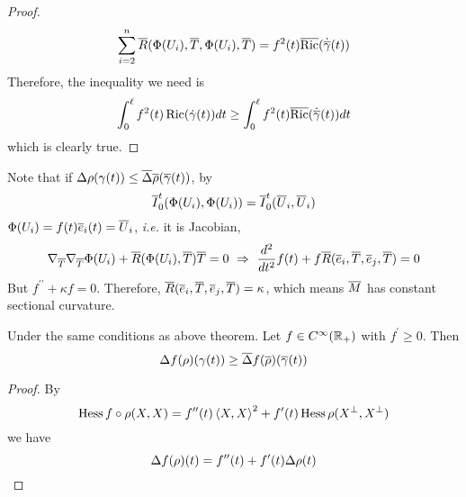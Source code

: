 \begin{enumerate}[label=\arabic{*}]
\begin{proof}
		\begin{equation*}
			\sum_{i=2}^n \overline{R}(\Phi(U_i),{\overline{T}},\Phi(U_i),{\overline{T}}) = f^2(t)\overline{\operatorname{Ric}}(\dot{\overline{\gamma}}(t))
		\end{equation*}
		Therefore, the inequality we need is
		\begin{equation*}
			\int_0^\ell f^2(t)\operatorname{Ric}(\dot{\gamma}(t)) dt \geq \int_0^\ell f^2(t)\overline{\operatorname{Ric}}(\dot{\overline{\gamma}}(t))dt
		\end{equation*}
		which is clearly true.
	\end{proof}
	\begin{rmk}
		Note that if $\Delta \rho (\gamma(t)) \leq \overline{\Delta} \overline{\rho}(\overline{\gamma}(t))$, by
		\begin{equation*}
			\overline{I}_0^t(\Phi(U_i),\Phi(U_i)) = \overline{I}_0^t(\overline{U}_i,\overline{U}_i)
		\end{equation*}
		$\Phi(U_i) = f(t)\overline{e}_i(t) = \overline{U}_i$, \emph{i.e.} it is Jacobian,
		\begin{equation*}
			\nabla_{\overline{T}}\nabla_{\overline{T}}\Phi(U_i)+\overline{R}(\Phi(U_i),\overline{T})\overline{T} = 0 ~\Rightarrow~ \frac{d^2}{dt^2}f(t) + f\overline{R}(\overline{e}_i,\overline{T},\overline{e}_j,\overline{T}) = 0
		\end{equation*}
		But $f^{\prime\prime} + \kappa f = 0$. Therefore, $\overline{R}(\overline{e}_i,\overline{T},\overline{e}_j,\overline{T}) = \kappa$, which means $\overline{M}$ has constant sectional curvature.
	\end{rmk}
	\begin{cor}
		Under the same conditions as above theorem. Let $f \in C^\infty(\mathbb{R}_+)$ with $f^\prime \geq 0$. Then
		\begin{equation*}
			\Delta f(\rho)(\gamma(t)) \geq \overline{\Delta} f(\overline{\rho})(\overline{\gamma}(t))
		\end{equation*}
	\end{cor}
	\begin{proof}
		By 
		\begin{equation*}
			\operatorname{Hess} f\circ\rho(X,X) = f^{\prime\prime}(t)\left\langle X,X \right\rangle^2 + f^\prime(t)\operatorname{Hess}\rho(X^\perp,X^\perp)
		\end{equation*}
		we have
		\begin{equation*}
			\Delta f(\rho)(t) = f^{\prime\prime}(t) + f^\prime(t)\Delta\rho(t) \qedhere
		\end{equation*}
	\end{proof}



\end{enumerate}

